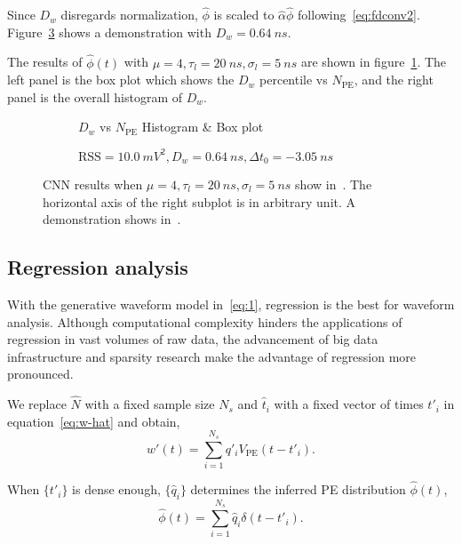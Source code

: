 Since $D_w$ disregards normalization, $\hat{\phi}$ is scaled to $\hat{\alpha}\hat{\phi}$ following~\eqref{eq:fdconv2}. Figure~\ref{fig:cnn} shows a demonstration with $D_w = \SI{0.64}{ns}$. 

The results of $\hat{\phi}(t)$ with $\mu=4, \tau_l=\SI{20}{ns}, \sigma_l=\SI{5}{ns}$ are shown in figure~\ref{fig:cnn-npe}. The left panel is the box plot which shows the $D_w$ percentile vs $N_{\mathrm{PE}}$, and the right panel is the overall histogram of $D_w$. 

\begin{figure}[H]
  \begin{subfigure}{.5\textwidth}
    \centering
    \resizebox{\textwidth}{!}{}
    \caption{\label{fig:cnn-npe} $D_w$ vs $N_{\mathrm{PE}}$ Histogram \& Box plot}
  \end{subfigure}
  \begin{subfigure}{.5\textwidth}
    \centering
    \resizebox{\textwidth}{!}{}
    \caption{\label{fig:cnn}$\mathrm{RSS}=\SI{10.0}{mV^2},D_w=\SI{0.64}{ns},\Delta t_0=\SI{-3.05}{ns}$}
  \end{subfigure}
  \caption{CNN results when $\mu=4, \tau_l=\SI{20}{ns}, \sigma_l=\SI{5}{ns}$ show in~. The horizontal axis of the right subplot is in arbitrary unit. A demonstration shows in~.}
\end{figure}

\subsection{Regression analysis}
With the generative waveform model in~\eqref{eq:1}, regression is the best for waveform analysis. Although computational complexity hinders the applications of regression in vast volumes of raw data, the advancement of big data infrastructure and sparsity research make the advantage of regression more pronounced.

We replace $\hat{N}$ with a fixed sample size $N_s$ and $\hat{t}_i$ with a fixed vector of times $t'_i$ in equation~\ref{eq:w-hat} and obtain, 
\begin{equation}
  \label{eq:gd}
  w'(t) = \sum_{i=1}^{N_s}q'_iV_\mathrm{PE}(t-t'_i).
\end{equation}

When $\{t'_i\}$ is dense enough, $\{\hat{q}_i\}$ determines the inferred PE distribution $\hat{\phi}(t)$,
\begin{equation}
  \label{eq:gd-phi}
  \hat{\phi}(t) = \sum_{i=1}^{N_s}\hat{q}_i\delta(t-t'_i).
\end{equation}

